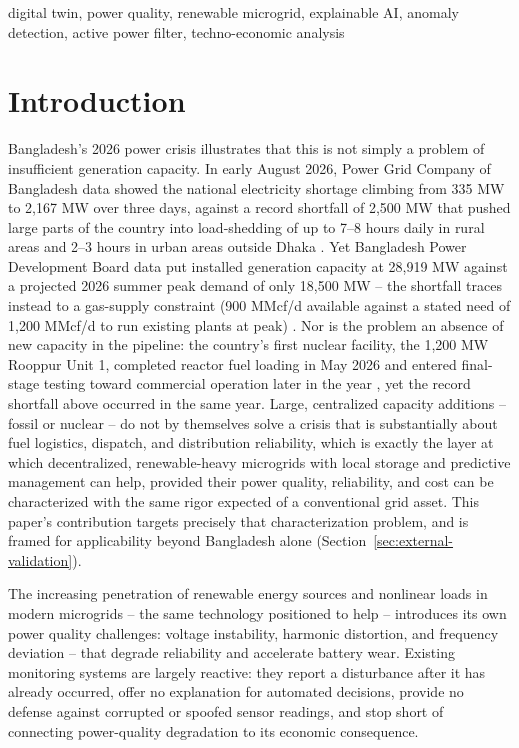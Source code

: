 \documentclass[conference]{IEEEtran}
\begin{document}
\begin{IEEEkeywords}
digital twin, power quality, renewable microgrid, explainable AI,
anomaly detection, active power filter, techno-economic analysis
\end{IEEEkeywords}

\section{Introduction}

Bangladesh's 2026 power crisis illustrates that this is not simply a
problem of insufficient generation capacity. In early August 2026,
Power Grid Company of Bangladesh data showed the national electricity
shortage climbing from 335 MW to 2{,}167 MW over three days, against a
record shortfall of 2{,}500 MW that pushed large parts of the country
into load-shedding of up to 7--8 hours daily in rural areas and 2--3
hours in urban areas outside Dhaka
\cite{dailystar2026loadshedding,dailysun2026rural}. Yet Bangladesh
Power Development Board data put installed generation capacity at
28{,}919 MW against a projected 2026 summer peak demand of only
18{,}500 MW -- the shortfall traces instead to a gas-supply
constraint (900 MMcf/d available against a stated need of 1{,}200
MMcf/d to run existing plants at peak) \cite{dailystar2026pdbplan}.
Nor is the problem an absence of new capacity in the pipeline: the
country's first nuclear facility, the 1{,}200 MW Rooppur Unit 1,
completed reactor fuel loading in May 2026 and entered final-stage
testing toward commercial operation later in the year
\cite{dailystar2026rooppur,tbs2026rooppur}, yet the record shortfall
above occurred in the same year. Large, centralized capacity
additions -- fossil or nuclear -- do not by themselves solve a crisis
that is substantially about fuel logistics, dispatch, and
distribution reliability, which is exactly the layer at which
decentralized, renewable-heavy microgrids with local storage and
predictive management can help, provided their power quality,
reliability, and cost can be characterized with the same rigor
expected of a conventional grid asset. This paper's contribution
targets precisely that characterization problem, and is framed for
applicability beyond Bangladesh alone (Section~\ref{sec:external-validation}).

The increasing penetration of renewable energy sources and nonlinear
loads in modern microgrids -- the same technology positioned to help
-- introduces its own power quality challenges: voltage instability,
harmonic distortion, and frequency deviation -- that degrade
reliability and accelerate battery wear. Existing
monitoring systems are largely reactive: they report a disturbance
after it has already occurred, offer no explanation for automated
decisions, provide no defense against corrupted or spoofed sensor
readings, and stop short of connecting power-quality degradation to
its economic consequence.
\end{document}
